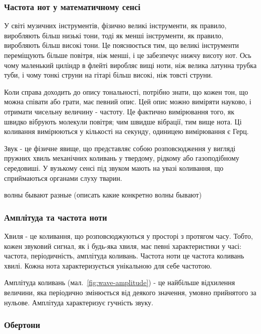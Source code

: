 \subsubsection{Частота нот у математичному сенсі}

У світі музичних інструментів, фізично великі інструменти, як правило, виробляють більш низькі тони, тоді як менші інструменти, як правило, виробляють більш високі тони. Це пояснюється тим, що великі інструменти переміщують більше повітря, ніж менші, і це забезпечує нижчу висоту нот. Ось чому маленький циліндр в флейті виробляє вищі ноти, ніж велика латунна трубка туби, і чому тонкі струни на гітарі більш високі, ніж товсті струни.

Коли справа доходить до опису тональності, потрібно знати, що кожен тон, що можна
співати або грати, має певний опис. Цей опис можно виміряти науково, і отримати чисельну величину - частоту. Це фактично вимірювання того, як швидко вібрують молекули повітря; чим швидше вібрації, тим вище нота. Ці коливання вимірюються у кількості на секунду, одиницею вимірювання є Герц. \cite{miller2005complete}

Звук - це фізичне явище, що представляє собою розповсюдження у вигляді пружних хвиль механічних коливань у твердому, рідкому або газоподібному середовиші. У вузькому сенсі під звуком мають на увазі коливання, що сприймаються органами слуху тварин.


волны бывают разные (описать какие конкретно волны бывают)

\subsubsection{Амплітуда та частота ноти}

Хвиля - це коливання, що розповсюджуються у просторі з протягом часу. Тобто, кожен звуковий сигнал, як і будь-яка хвиля, має певні характеристики у часі: частота, періодичність, амплітуда коливань.  Частота ноти це частота коливань хвилі. Кожна нота характеризується унікальною для себе частотою.

Амплітуда коливань (мал.~\ref{fig:wave-amplitude}) - це найбільше відхилення величини, яка періодично змінюється від деякого значення, умовно прийнятого за нульове. Амплітуда характеризує гучність звуку. \cite{яворський2007довідник}



\subsubsection{Обертони}

